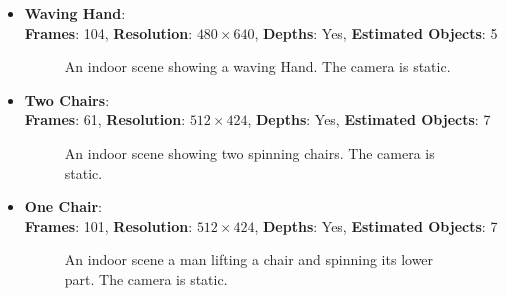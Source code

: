\begin{itemize}
\begin{figure}[H]
\label{fig:eval_datasets_statue}
\end{figure}
\item \textbf{Waving Hand}: \\
\textbf{Frames}: 104, \textbf{Resolution}: $480 \times 640$, \textbf{Depths}: Yes, \textbf{Estimated Objects}: 5
\begin{figure}[H]
\begin{center}
\end{center}
\caption[Dataset Waving Hand]{An indoor scene showing a waving Hand. The camera is static.}
\label{fig:eval_datasets_waving_hand}
\end{figure}
\item \textbf{Two Chairs}: \\
\textbf{Frames}: 61, \textbf{Resolution}: $512 \times 424$, \textbf{Depths}: Yes, \textbf{Estimated Objects}: 7
\begin{figure}[H]
\begin{center}
\end{center}
\caption[Dataset Two Chairs]{An indoor scene showing two spinning chairs. The camera is static.}
\label{fig:eval_datasets_two_chairs}
\end{figure}
\item \textbf{One Chair}: \\
\textbf{Frames}: 101, \textbf{Resolution}: $512 \times 424$, \textbf{Depths}: Yes, \textbf{Estimated Objects}: 7
\begin{figure}[H]
\begin{center}
\end{center}
\caption[Dataset One Chair]{An indoor scene a man lifting a chair and spinning its lower part. The camera is static.}
\label{fig:eval_datasets_one_chair}
\end{figure}
\end{itemize}


